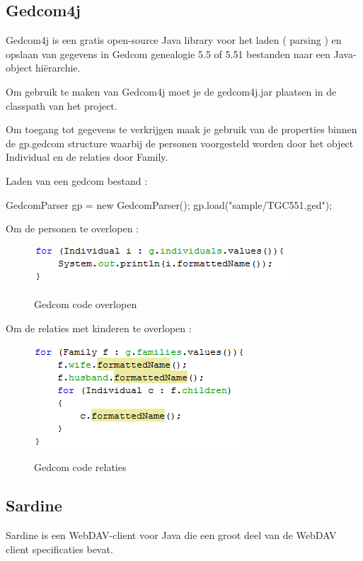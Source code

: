 \documentclass[pdftex,a4paper,12pt,twoside]{report}
\begin{document}
\subsection{Gedcom4j}
Gedcom4j is een gratis open-source Java library voor het laden ( parsing ) en opslaan van gegevens in Gedcom genealogie 5.5 of 5.51 bestanden naar een Java-object hiërarchie.

Om gebruik te maken van Gedcom4j moet je de gedcom4j.jar plaatsen in de classpath van het project.

Om toegang tot gegevens te verkrijgen maak je gebruik van de properties binnen de gp.gedcom structure waarbij de personen voorgesteld worden door het object Individual en de relaties door Family.

Laden van een gedcom bestand :

GedcomParser gp = new GedcomParser();
gp.load("sample/TGC551.ged");

Om de personen te overlopen  :

\begin{figure}[!htb]
\includegraphics{images/gedcomindividual.png}\\
\caption{Gedcom code overlopen}
\end{figure}

Om de relaties met kinderen te overlopen :

\begin{figure}[!htb]
\includegraphics{images/gedcomfamily.png}\\
\caption{Gedcom code relaties}
\end{figure}

\subsection{Sardine}

Sardine is een WebDAV-client voor Java die een groot deel van de WebDAV client specificaties bevat. 
\end{document}

